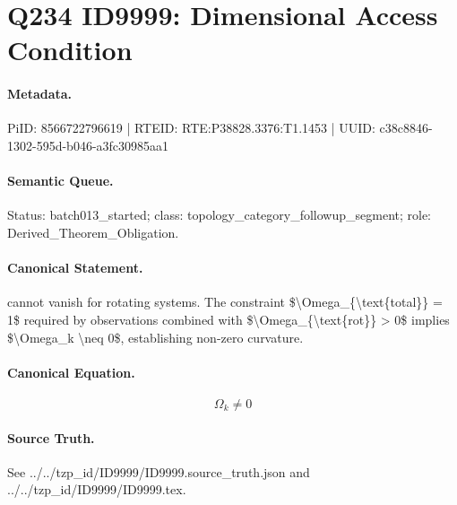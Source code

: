 \section*{Q234 ID9999: Dimensional Access Condition}
\paragraph{Metadata.}
PiID: 8566722796619 | RTEID: RTE:P38828.3376:T1.1453 | UUID: c38c8846-1302-595d-b046-a3fc30985aa1

\paragraph{Semantic Queue.}
Status: batch013\_started; class: topology\_category\_followup\_segment; role: Derived\_Theorem\_Obligation.

\paragraph{Canonical Statement.}
cannot vanish for rotating systems. The constraint \$\textbackslash{}Omega\_\{\textbackslash{}text\{total\}\} = 1\$ required by observations combined with \$\textbackslash{}Omega\_\{\textbackslash{}text\{rot\}\} > 0\$ implies \$\textbackslash{}Omega\_k \textbackslash{}neq 0\$, establishing non-zero curvature.

\paragraph{Canonical Equation.}
\[
\Omega_k \neq 0
\]

\paragraph{Source Truth.}
See ../../tzp\_id/ID9999/ID9999.source\_truth.json and ../../tzp\_id/ID9999/ID9999.tex.
